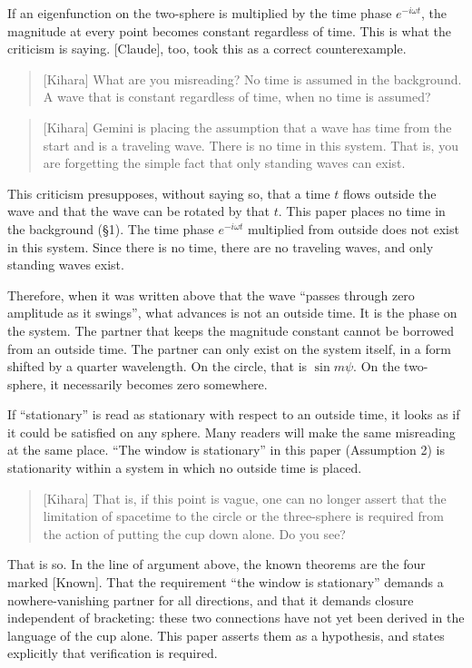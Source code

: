 \documentclass[
  a4paper,
]{article}
\begin{document}
If an eigenfunction on the two-sphere is multiplied by the time phase
\(e^{-i\omega t}\), the magnitude at every point becomes constant
regardless of time. This is what the criticism is saying. {[}Claude{]},
too, took this as a correct counterexample.

\begin{quote}
{[}Kihara{]} What are you misreading? No time is assumed in the
background. A wave that is constant regardless of time, when no time is
assumed?
\end{quote}

\begin{quote}
{[}Kihara{]} Gemini is placing the assumption that a wave has time from
the start and is a traveling wave. There is no time in this system. That
is, you are forgetting the simple fact that only standing waves can
exist.
\end{quote}

This criticism presupposes, without saying so, that a time \(t\) flows
outside the wave and that the wave can be rotated by that \(t\). This
paper places no time in the background (§1). The time phase
\(e^{-i\omega t}\) multiplied from outside does not exist in this
system. Since there is no time, there are no traveling waves, and only
standing waves exist.

Therefore, when it was written above that the wave ``passes through zero
amplitude as it swings'', what advances is not an outside time. It is
the phase on the system. The partner that keeps the magnitude constant
cannot be borrowed from an outside time. The partner can only exist on
the system itself, in a form shifted by a quarter wavelength. On the
circle, that is \(\sin m\psi\). On the two-sphere, it necessarily
becomes zero somewhere.

If ``stationary'' is read as stationary with respect to an outside time,
it looks as if it could be satisfied on any sphere. Many readers will
make the same misreading at the same place. ``The window is stationary''
in this paper (Assumption 2) is stationarity within a system in which no
outside time is placed.

\begin{quote}
{[}Kihara{]} That is, if this point is vague, one can no longer assert
that the limitation of spacetime to the circle or the three-sphere is
required from the action of putting the cup down alone. Do you see?
\end{quote}

That is so. In the line of argument above, the known theorems are the
four marked {[}Known{]}. That the requirement ``the window is
stationary'' demands a nowhere-vanishing partner for all directions, and
that it demands closure independent of bracketing: these two connections
have not yet been derived in the language of the cup alone. This paper
asserts them as a hypothesis, and states explicitly that verification is
required.
\end{document}
